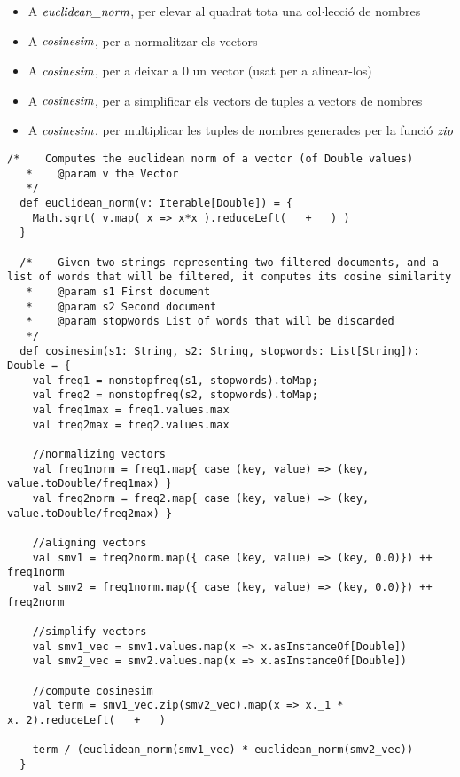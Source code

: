 \documentclass{report}
\begin{document}
\begin{itemize}
  \item A $\emph{euclidean\_norm}$, per elevar al quadrat tota una col$ \cdot $lecció de nombres
  \item A $\emph{cosinesim}$, per a normalitzar els vectors
  \item A $\emph{cosinesim}$, per a deixar a 0 un vector (usat per a alinear-los)
  \item A $\emph{cosinesim}$, per a simplificar els vectors de tuples a vectors de nombres
  \item A $\emph{cosinesim}$, per multiplicar les tuples de nombres generades per la funció $\emph{zip}$
\end{itemize}

\begin{lstlisting}[style=scalaHighlight]
  /*	Computes the euclidean norm of a vector (of Double values)
   *	@param v the Vector
   */
  def euclidean_norm(v: Iterable[Double]) = {
    Math.sqrt( v.map( x => x*x ).reduceLeft( _ + _ ) )
  }

  /*	Given two strings representing two filtered documents, and a list of words that will be filtered, it computes its cosine similarity
   * 	@param s1 First document
   * 	@param s2 Second document
   * 	@param stopwords List of words that will be discarded
   */
  def cosinesim(s1: String, s2: String, stopwords: List[String]): Double = {
    val freq1 = nonstopfreq(s1, stopwords).toMap;
    val freq2 = nonstopfreq(s2, stopwords).toMap;
    val freq1max = freq1.values.max
    val freq2max = freq2.values.max

    //normalizing vectors
    val freq1norm = freq1.map{ case (key, value) => (key, value.toDouble/freq1max) }
    val freq2norm = freq2.map{ case (key, value) => (key, value.toDouble/freq2max) }

    //aligning vectors
    val smv1 = freq2norm.map({ case (key, value) => (key, 0.0)}) ++ freq1norm
    val smv2 = freq1norm.map({ case (key, value) => (key, 0.0)}) ++ freq2norm

    //simplify vectors
    val smv1_vec = smv1.values.map(x => x.asInstanceOf[Double])
    val smv2_vec = smv2.values.map(x => x.asInstanceOf[Double])

    //compute cosinesim
    val term = smv1_vec.zip(smv2_vec).map(x => x._1 * x._2).reduceLeft( _ + _ )

    term / (euclidean_norm(smv1_vec) * euclidean_norm(smv2_vec))
  }
\end{lstlisting}
\end{document}
